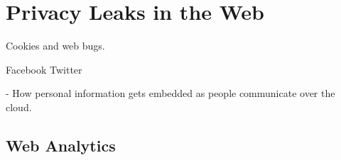 \chapter{Privacy Leaks in the Web}
Cookies and web bugs.

Facebook Twitter

- How personal information gets embedded as people communicate over the cloud.

\section{Web Analytics}

